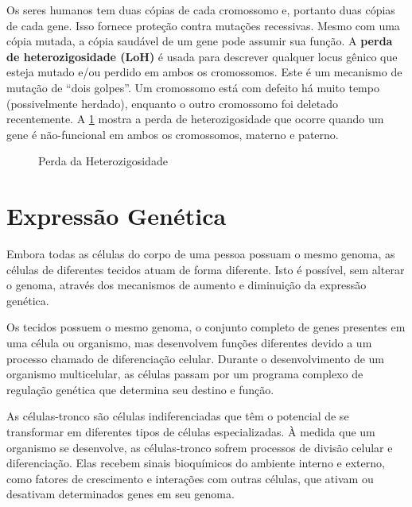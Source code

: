 \documentclass[11pt,a4paper]{article}
\begin{document}
		Os seres humanos tem duas cópias de cada cromossomo e, portanto duas cópias de cada gene. Isso fornece proteção contra mutações recessivas. Mesmo com uma cópia mutada, a cópia saudável de um gene pode assumir sua função. A \textcolor{CarnationPink}{\textbf{perda de heterozigosidade (LoH)}} é usada para descrever qualquer locus gênico que esteja mutado e/ou perdido em ambos os cromossomos. Este é um mecanismo de mutação de “dois golpes”. Um cromossomo está com defeito há muito tempo (possivelmente herdado), enquanto o outro cromossomo foi deletado recentemente. A \ref{fig:perdaDaHeterozigosidade} mostra a perda de heterozigosidade que ocorre quando um gene é não-funcional em ambos os cromossomos, materno e paterno.

			\begin{figure}[h]
				\centering
				\caption{Perda da Heterozigosidade}
				\label{fig:perdaDaHeterozigosidade}
			\end{figure}

	\section{Expressão Genética}
	
		Embora todas as células do corpo de uma pessoa possuam o mesmo genoma, as células de diferentes tecidos atuam de forma diferente. Isto é possível, sem alterar o genoma, através dos mecanismos de aumento e diminuição da expressão genética.

		Os tecidos possuem o mesmo genoma, o conjunto completo de genes presentes em uma célula ou organismo, mas desenvolvem funções diferentes devido a um processo chamado de diferenciação celular. Durante o desenvolvimento de um organismo multicelular, as células passam por um programa complexo de regulação genética que determina seu destino e função.

		As células-tronco são células indiferenciadas que têm o potencial de se transformar em diferentes tipos de células especializadas. À medida que um organismo se desenvolve, as células-tronco sofrem processos de divisão celular e diferenciação. Elas recebem sinais bioquímicos do ambiente interno e externo, como fatores de crescimento e interações com outras células, que ativam ou desativam determinados genes em seu genoma.
\end{document}
